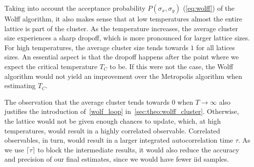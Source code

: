 		Taking into account the acceptance probability $P(\sigma_x, \sigma_y)$ (\cref{eq:wolff}) of the Wolff algorithm, it also makes sense that at low temperatures almost the entire lattice is part of the cluster. As the temperature increases, the average cluster size experiences a sharp dropoff, which is more pronounced for larger lattice sizes. For high temperatures, the average cluster size tends towards $\num{1}$ for all latices sizes. An essential aspect is that the dropoff happens after the point where we expect the critical temperature $T_C$ to be. If this were not the case, the Wolff algorithm would not yield an improvement over the Metropolis algorithm when estimating $T_C$.
		
		The observation that the average cluster tends towards $\num{0}$ when $T\rightarrow \infty$ also justifies the introduction of~\cref{wolf_loop} in~\cref{sec:theo:wolff_cluster}. Otherwise, the lattice would not be given enough chances to update, which, at high temperatures, would result in a highly correlated observable. Correlated observables, in turn, would result in a larger integrated autocorrelation time $\tau$. As we use $\lceil \tau \rceil$ to block the intermediate results, it would also reduce the accuracy and precision of our final estimates, since we would have fewer iid samples.
	